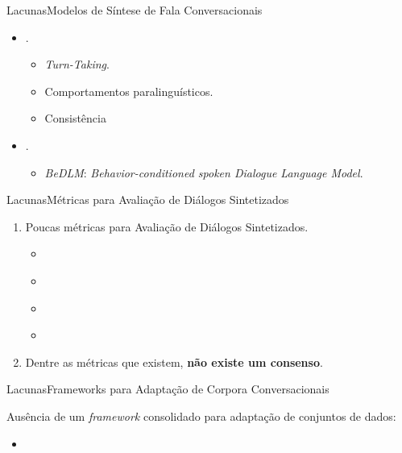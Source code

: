 \begin{frame}{Lacunas}{Modelos de Síntese de Fala Conversacionais}
  \begin{block}{}
    \begin{itemize}
      \item {} \cite{CoVoMix_2024}.
        \begin{itemize}
          \item \textit{Turn-Taking}.
          \item Comportamentos paralinguísticos.
          \item Consistência
        \end{itemize}
      \item {} \cite{Behavior-SD}.
        \begin{itemize}
          \item \textit{BeDLM}: \textit{Behavior-conditioned spoken Dialogue
            Language Model}.
        \end{itemize}
    \end{itemize}
  \end{block}
\end{frame}

\begin{frame}{Lacunas}{Métricas para Avaliação de Diálogos Sintetizados}
  \begin{block}{}
    \begin{enumerate}
      \item Poucas métricas para Avaliação de Diálogos Sintetizados.
        \begin{itemize}
          \item {} \cite{prosody_eval_julio}
          \item {} \cite{Conv_Naturalness_Predictor}
          \item {} \cite{Behavior-SD}
          \item {} \cite{Responsible_Evaluation}
        \end{itemize}
      \item Dentre as métricas que existem, \textbf{não existe um consenso}.
    \end{enumerate}
  \end{block}
\end{frame}

\begin{frame}{Lacunas}{Frameworks para Adaptação de Corpora Conversacionais}
  \begin{block}{}
    Ausência de um \textit{framework} consolidado para adaptação de conjuntos de dados:
    \begin{itemize}
      \item {} \cite{nvidia_dataset_toolbox}
    \end{itemize}
  \end{block}
\end{frame}
